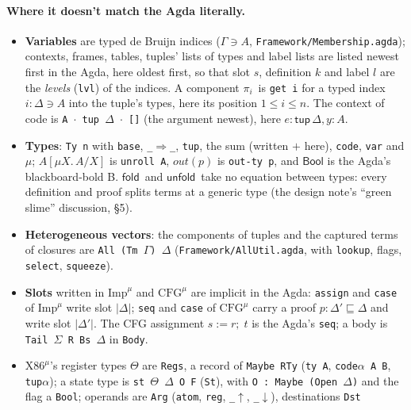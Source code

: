 \documentclass[10pt]{article}
\theoremstyle{acmplain}
\newcommand{\key}[1]{\mathsf{#1}}
\newcommand{\prj}[1]{\pi_{#1}\,}
\newcommand{\assign}[3]{#1 \mathrel{:=} #2;\; #3}
\newcommand{\Tout}[1]{\mathit{out}(#1)}        %
\newcommand{\Ml}[1]{\textrm{#1}^{\mu}}                  %
\newcommand{\Mtup}[1]{\key{tup}\,#1}                      %
\newcommand{\Munroll}[2]{#2[\mu #1.\,#2/#1]}              %
\newcommand{\Mfold}{\key{fold}\,}
\newcommand{\Munfold}{\key{unfold}\,}
\begin{document}
\paragraph{Where it doesn't match the Agda literally.}
\begin{itemize}
\item \textbf{Variables} are typed de Bruijn indices (\texttt{$\Gamma \ni A$},
  \texttt{Framework/Membership.agda}); contexts, frames, tables, tuples'
  lists of types and label lists are listed newest first in the Agda,
  here oldest first, so that slot $s$, definition $k$ and label $l$ are
  the \emph{levels} (\texttt{lvl}) of the indices. A component $\prj{i}$
  is \texttt{get i} for a typed index $i : \Delta \ni A$ into the tuple's
  types, here its position $1 \leq i \leq n$. The context of code is
  \texttt{A $\cdot$ tup $\Delta$ $\cdot$ []} (the argument newest), here
  $e{:}\Mtup{\Delta}, y{:}A$.
\item \textbf{Types}: \texttt{Ty n} with \texttt{base}, \texttt{\_$\Rightarrow$\_},
  \texttt{tup}, the sum (written $+$ here), \texttt{code},
  \texttt{var} and \texttt{$\mu$}; $\Munroll{X}{A}$ is \texttt{unroll A}, $\Tout{p}$ is
  \texttt{out-ty p}, and $\key{Bool}$ is the Agda's blackboard-bold B.
  $\Mfold$ and $\Munfold$ take no equation between types: every definition
  and proof splits terms at a generic type (the design note's ``green
  slime'' discussion, \S5).
\item \textbf{Heterogeneous vectors}: the components of tuples and the
  captured terms of closures are \texttt{All (Tm $\Gamma$) $\Delta$}
  (\texttt{Framework/AllUtil.agda}, with \texttt{lookup}, flags,
  \texttt{select}, \texttt{squeeze}).
\item \textbf{Slots} written in $\Ml{Imp}$ and $\Ml{CFG}$ are implicit in the
  Agda: \texttt{assign} and \texttt{case} of $\Ml{Imp}$ write slot $|\Delta|$;
  \texttt{seq} and \texttt{case} of $\Ml{CFG}$ carry a proof
  $p : \Delta' \sqsubseteq \Delta$ and write slot $|\Delta'|$. The CFG
  assignment $\assign{s}{r}{t}$ is the Agda's \texttt{seq}; a body is
  \texttt{Tail $\Sigma$ R Bs $\Delta$} in \texttt{Body}.
\item \textbf{$\Ml{X86}$}'s register types $\Theta$ are \texttt{Regs}, a
  record of \texttt{Maybe RTy} (\texttt{ty A}, \texttt{code$\alpha$ A B},
  \texttt{tup$\alpha$}); a state type is \texttt{st $\Theta$ $\Delta$ O F}
  (\texttt{St}), with \texttt{O : Maybe (Open $\Delta$)} and the flag a
  \texttt{Bool}; operands are \texttt{Arg} (\texttt{atom}, \texttt{reg},
  \texttt{\_$\uparrow$}, \texttt{\_$\downarrow$}), destinations \texttt{Dst}

\end{itemize}
\end{document}
